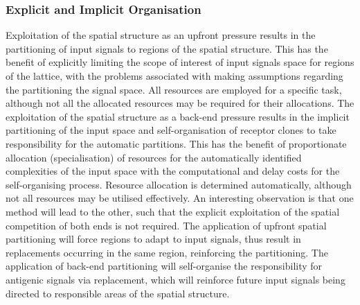 %
%
\subsubsection{Explicit and Implicit Organisation}
Exploitation of the spatial structure as an upfront pressure results in the partitioning of input signals to regions of the spatial structure. This has the benefit of explicitly limiting the scope of interest of input signals space for regions of the lattice, with the problems associated with making assumptions regarding the partitioning the signal space. All resources are employed for a specific task, although not all the allocated resources may be required for their allocations. The exploitation of the spatial structure as a back-end pressure results in the implicit partitioning of the input space and self-organisation of receptor clones to take responsibility for the automatic partitions. This has the benefit of proportionate allocation (specialisation) of resources for the automatically identified complexities of the input space with the computational and delay costs for the self-organising process. Resource allocation is determined automatically, although not all resources may be utilised effectively. An interesting observation is that one method will lead to the other, such that the explicit exploitation of the spatial competition of both ends is not required. The application of upfront spatial partitioning will force regions to adapt to input signals, thus result in replacements occurring in the same region, reinforcing the partitioning. The application of back-end partitioning will self-organise the responsibility for antigenic signals via replacement, which will reinforce future input signals being directed to responsible areas of the spatial structure.

